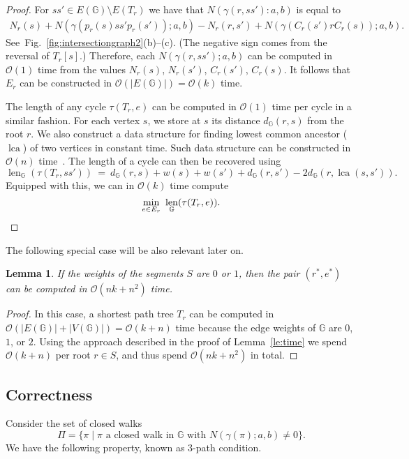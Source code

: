 \documentclass[11pt,a4paper]{article}
\newtheorem{lemma}[definition]{Lemma}
\def\I{\ensuremath{\mathbb{G}}}
\def\cycle{\ensuremath{\tau}}
\DeclareMathOperator{\lengthBIS}{len}
\newcommand\length{\lengthBIS_{\I}}
\DeclareMathOperator{\lca}{lca}
\begin{document}
\begin{proof}
	For $ss'\in E(\I)\setminus E(T_r)$ we have that $N(\gamma(r,ss'):a,b)$ is equal to
	\begin{align*}
		 N_r(s) + N(\gamma( p_r(s)ss' p_r(s'));a,b) - N_r(r,s') + N(\gamma( C_r(s')r C_r(s));a,b).
	\end{align*}
	See~Fig.~\ref{fig:intersectiongraph2}(b)--(c).
	(The negative sign comes from the reversal of $T_r[s]$.)
	Therefore, each $N(\gamma(r,ss');a,b)$ can be computed in $\mathcal{O}(1)$ time from the values $N_r(s)$, $N_r(s')$, $C_r(s')$, $C_r(s)$.
	It follows that $E_r$ can be constructed in $\mathcal{O}(|E(\I)|)=\mathcal{O}(k)$ time.
	
	The length of any cycle $\cycle(T_r,e)$ can be computed in $\mathcal{O}(1)$ time per cycle in a similar fashion.
	For each vertex $s$, we store at $s$ its distance $d_\I(r,s)$ from the root $r$.
	We also construct a data structure for finding lowest common ancestor ($\lca$) of two vertices in constant
	time. Such data structure can be constructed in $\mathcal{O}(n)$ time~\cite{lca1,lca2}. The length of a cycle can then be recovered using
	\[
		\length(\cycle (T_r,ss'))~=~ d_\I (r,s)+ w(s)+w(s') + d_\I(r,s') - 2 d_\I (r,\lca (s,s')).
	\]
	Equipped with this, we can in $\mathcal{O}(k)$ time compute
	\[
		\min_{e\in E_r}~ \length(\cycle(T_r,e)). \qedhere
	\]
\end{proof}

The following special case will be also relevant later on.
\begin{lemma}\label{le:time2}
	If the weights of the segments $S$ are $0$ or $1$, 
	then the pair $(r^*,e^*)$ can be computed in $\mathcal{O}(nk+ n^2)$ time.
\end{lemma}
\begin{proof}
	In this case, a shortest path tree $T_r$ can be computed 
	in $\mathcal{O}(|E(\I)| + |V(\I)|) = \mathcal{O}(k+n)$ time
	because the edge weights of $\I$ are $0$, $1$, or $2$.
	Using the approach described in the proof of Lemma~\ref{le:time} we spend $\mathcal{O}(k+n)$ per root $r\in S$,
	and thus spend $\mathcal{O}(nk+n^2)$ in total.
\end{proof}

\subsection{Correctness}

Consider the set of closed walks
\[
	\Pi = \{ \pi\mid \mbox{$\pi$ a closed walk in $\I$ with $N(\gamma(\pi);a,b)\not =0$} \}.
\] 
We have the following property, known as 3-path condition.
\end{document}
